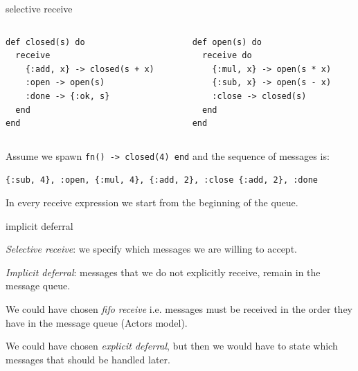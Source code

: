 \begin{frame}[fragile]{selective receive}

\begin{columns}
 \begin{column}{0.5\linewidth}
\begin{verbatim}
def closed(s) do 
  receive 
    {:add, x} -> closed(s + x)
    :open -> open(s)
    :done -> {:ok, s}
  end
end
\end{verbatim}
 \end{column}
\pause
 \begin{column}{0.5\linewidth}
\begin{verbatim}
def open(s) do
  receive do
    {:mul, x} -> open(s * x)
    {:sub, x} -> open(s - x)
    :close -> closed(s)
  end
end
\end{verbatim}
\end{column}
\end{columns}


\pause\vspace{10pt}

Assume we spawn {\tt fn() -> closed(4) end} and the sequence of messages is:

\vspace{10pt}

{\tt \{:sub, 4\}, :open, \{:mul, 4\}, \{:add, 2\}, :close \{:add, 2\}, :done}

\pause\vspace{10pt}

In every receive expression we start from the beginning of the queue.

\end{frame}


\begin{frame}{implicit deferral}

{\em Selective receive}: we specify which messages we are willing to accept.

\pause\vspace{20pt}

{\em Implicit deferral}: messages that we do not explicitly receive, remain in the message queue.

\pause\vspace{20pt}
We could have chosen {\em fifo receive} i.e. messages must be received
in the order they have in the message queue (Actors model).

\pause\vspace{20pt}

We could have chosen {\em explicit deferral}, but then we would have to
state which messages that should be handled later.

\end{frame}

